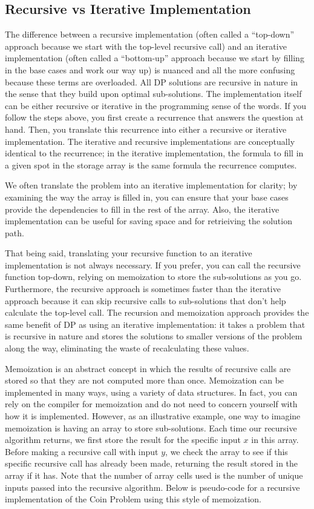 \documentclass[11pt]{article}
\begin{document}
\subsection{Recursive vs Iterative Implementation}
\label{sec:implementation}
The difference between a recursive implementation (often called a ``top-down'' approach because we start with the top-level recursive call) and an iterative implementation (often called a ``bottom-up'' approach because we start by filling in the base cases and work our way up) is nuanced and all the more confusing because these terms are overloaded. All DP solutions are recursive in nature in the sense that they build upon optimal sub-solutions. The implementation itself can be either recursive or iterative in the programming sense of the words. If you follow the steps above, you first create a recurrence that answers the question at hand. Then, you translate this recurrence into either a recursive or iterative implementation. The iterative and recursive implementations are conceptually identical to the recurrence; in the iterative implementation, the formula to fill in a given spot in the storage array is the same formula the recurrence computes. 

We often translate the problem into an iterative implementation for clarity; by examining the way the array is filled in, you can ensure that your base cases provide the dependencies to fill in the rest of the array. Also, the iterative implementation can be useful for saving space and for retrieiving the solution path. 

That being said, translating your recursive function to an iterative implementation is not always necessary. If you prefer, you can call the recursive function top-down, relying on memoization to store the sub-solutions as you go. Furthermore, the recursive approach is sometimes faster than the iterative approach because it can skip recursive calls to sub-solutions that don't help calculate the top-level call. The recursion and memoization approach provides the same benefit of DP as using an iterative implementation: it takes a problem that is recursive in nature and stores the solutions to smaller versions of the problem along the way, eliminating the waste of recalculating these values.

Memoization is an abstract concept in which the results of recursive calls are stored so that they are not computed more than once. Memoization can be implemented in many ways, using a variety of data structures. In fact, you can rely on the compiler for memoization and do not need to concern yourself with how it is implemented. However, as an illustrative example, one way to imagine memoization is having an array to store sub-solutions. Each time our recursive algorithm returns, we first store the result for the specific input $x$ in this array.  Before making a recursive call with input $y$, we check the array to see if this specific recursive call has already been made, returning the result stored in the array if it has. Note that the number of array cells used is the number of unique inputs passed into the recursive algorithm. Below is pseudo-code for a recursive implementation of the Coin Problem using this style of memoization. \\
\end{document}
